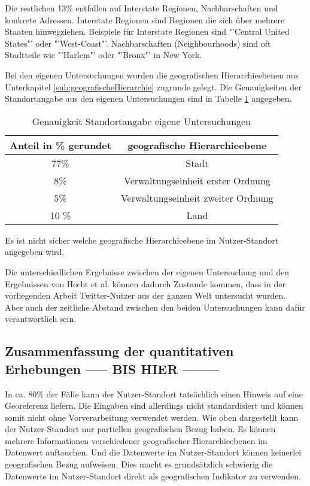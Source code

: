 				Die restlichen 13\% entfallen auf Interstate Regionen, Nachbarschaften und konkrete Adressen. 
				Interstate Regionen sind Regionen die sich über mehrere Staaten hinwegziehen. 
				Beispiele für Interstate Regionen sind "'Central United States"' oder "'West-Coast"'.
				Nachbarschaften (Neighbourhoods) sind oft Stadtteile wie "'Harlem"' oder "'Bronx"' in New York.

				Bei den eigenen Untersuchungen wurden die geografischen Hierarchieebenen aus Unterkapitel \ref{sub:geografischeHierarchie} zugrunde gelegt.
				Die Genauigkeiten der Standortangabe aus den eigenen Untersuchungen sind in Tabelle \ref{tab:genauigkeitenEigene} angegeben.

				\begin{table}[htpb]
				\caption{Genauigkeit Standortangabe eigene Untersuchungen} 
				\centering
				\begin{tabular}{|c||c|}
					\hline
					Anteil in \% gerundet & geografische Hierarchieebene \\
					\hline\hline
					77\% & Stadt \\
					\hline
					8\% & Verwaltungseinheit erster Ordnung  \\
					\hline
					5\% & Verwaltungseinheit zweiter Ordnung  \\
					\hline
					10 \% & Land \\
					\hline
				\end{tabular}
				\label{tab:genauigkeitenEigene} 
				\end{table} 

				Es ist nicht sicher welche geografische Hierarchieebene im Nutzer-Standort angegeben wird. 

				Die unterschiedlichen Ergebnisse zwischen der eigenen Untersuchung und den Ergebnissen von Hecht et al. können dadurch Zustande kommen, dass in der vorliegenden Arbeit Twitter-Nutzer aus der ganzen Welt untersucht wurden.
				Aber auch der zeitliche Abstand zwischen den beiden Untersuchungen kann dafür verantwortlich sein.  
			


			\subsection{Zusammenfassung der quantitativen Erhebungen ----- BIS HIER --------} 

			In ca. 80\% der Fälle kann der Nutzer-Standort tatsächlich einen Hinweis auf eine Georeferenz liefern.
			Die Eingaben sind allerdings nicht standardisiert und können somit nicht ohne Vorverarbeitung verwendet werden.
			Wie oben dargestellt kann der Nutzer-Standort nur partiellen geografischen Bezug haben.
			Es können mehrere Informationen verschiedener geografischer Hierarchieebenen im Datenwert auftauchen. 
			Und die Datenwerte im Nutzer-Standort können keinerlei geografischen Bezug aufweisen.
			Dies macht es grundsätzlich schwierig die Datenwerte im Nutzer-Standort direkt als geografischen Indikator zu verwenden.
			
